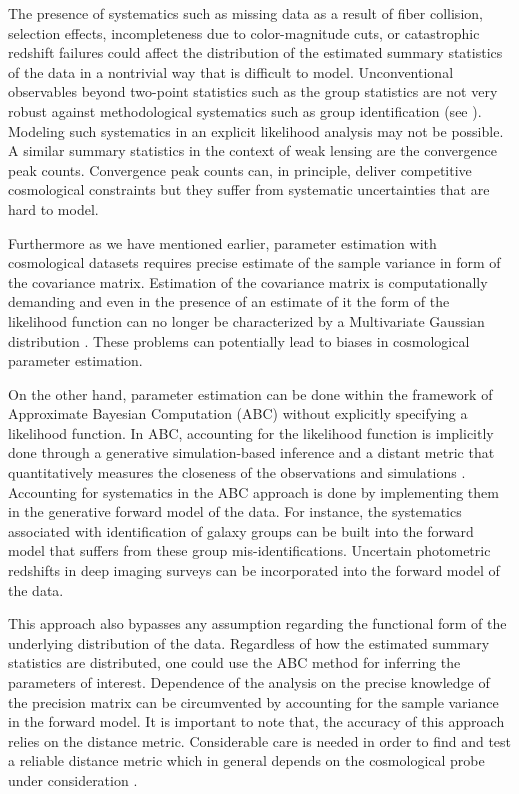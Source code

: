 The presence of systematics such as missing data as a result of fiber collision, selection effects, incompleteness due to color-magnitude cuts, 
or catastrophic redshift failures \citep{guo2012,Ross:2012aa,Hahn:2017a} could affect the distribution of the estimated summary statistics of the data 
in a nontrivial way that is difficult to model. Unconventional observables beyond two-point statistics such as the group statistics are not very 
robust against methodological systematics such as group identification (see \citealt{groups,campbell2015}). Modeling such systematics in an explicit likelihood analysis may not be possible. A similar summary statistics in the context of weak lensing are the convergence peak counts. Convergence peak counts can, in principle, deliver competitive cosmological constraints but they suffer from systematic uncertainties \citep{abcwl2} that are hard to model. 

Furthermore as we have mentioned earlier, parameter estimation with cosmological datasets requires precise estimate of 
the sample variance in form of the covariance matrix. Estimation of the covariance matrix is computationally demanding \citep{chuang2015,harnois} and even 
in the presence of an estimate of it the form of the likelihood function can no longer be characterized by a Multivariate Gaussian distribution \citep{Sellentin:2016a,Sellentin:2017a}.
These problems can potentially lead to biases in cosmological parameter estimation.

On the other hand, parameter estimation can be done within the framework of Approximate Bayesian Computation (ABC) without explicitly 
specifying a likelihood function. In ABC, accounting for the likelihood function is implicitly done through a 
generative simulation-based inference and a distant metric that quantitatively 
measures the closeness of the observations and simulations \citep{optimalkernel,abcpmc}. Accounting for systematics in the ABC approach is done by implementing 
them in the generative forward model of the data. For instance, the systematics associated with identification of galaxy groups can be built into the forward model that suffers from these group mis-identifications. Uncertain photometric redshifts in deep imaging surveys can be incorporated into the forward model of the data.   

This approach also bypasses any assumption regarding the functional form of the underlying distribution of the data. Regardless of how the estimated summary statistics are 
distributed, one could use the ABC method for inferring the parameters of interest.
Dependence of the analysis on the precise knowledge of the precision matrix can be circumvented by accounting for the sample variance 
in the forward model. It is important to note that, the accuracy of this approach relies on the distance metric. Considerable care is needed in order to find and test a reliable distance metric which in general depends on the cosmological probe under consideration \citep{abcsn,abcwl,jennings2016a,jennings2016b}. 

